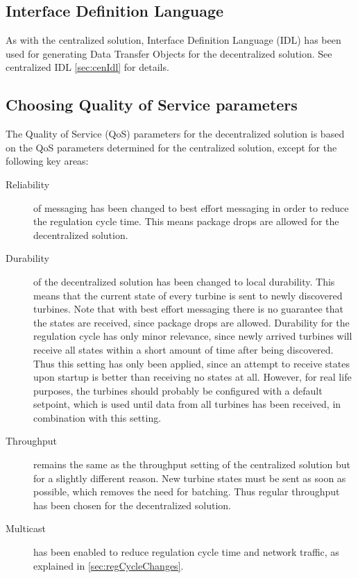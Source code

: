 \subsection{Interface Definition Language}\label{sec:decenIdl}

As with the centralized solution, Interface Definition Language (IDL) has been used for generating Data Transfer Objects for the decentralized solution. See centralized IDL \cref{sec:cenIdl} for details.


\subsection{Choosing Quality of Service parameters}\label{sec:decenChoosingQoS}

The Quality of Service (QoS) parameters for the decentralized solution is based on the QoS parameters determined for the centralized solution, except for the following key areas:

\begin{description}
	\item[Reliability] of messaging has been changed to best effort messaging in order to reduce the regulation cycle time. This means package drops are allowed for the decentralized solution.
	\item[Durability] of the decentralized solution has been changed to local durability. This means that the current state of every turbine is sent to newly discovered turbines. Note that with best effort messaging there is no guarantee that the states are received, since package drops are allowed. Durability for the regulation cycle has only minor relevance, since newly arrived turbines will receive all states within a short amount of time after being discovered. Thus this setting has only been applied, since an attempt to receive states upon startup is better than receiving no states at all. However, for real life purposes, the turbines should probably be configured with a default setpoint, which is used until data from all turbines has been received, in combination with this setting. 
	\item[Throughput] remains the same as the throughput setting of the centralized solution but for a slightly different reason. New turbine states must be sent as soon as possible, which removes the need for batching.  Thus regular throughput has been chosen for the decentralized solution. 
	\item[Multicast] has been enabled to reduce regulation cycle time and network traffic, as explained in \cref{sec:regCycleChanges}.
\end{description}

